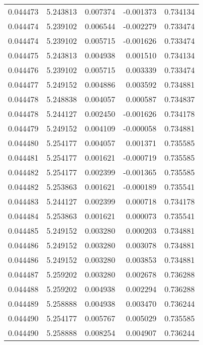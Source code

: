 \begin{tabular}{lrrrr}
0.044473    &  5.243813 &  0.007374 & -0.001373 &             0.734134 \\
0.044474    &  5.239102 &  0.006544 & -0.002279 &             0.733474 \\
0.044474    &  5.239102 &  0.005715 & -0.001626 &             0.733474 \\
0.044475    &  5.243813 &  0.004938 &  0.001510 &             0.734134 \\
0.044476    &  5.239102 &  0.005715 &  0.003339 &             0.733474 \\
0.044477    &  5.249152 &  0.004886 &  0.003592 &             0.734881 \\
0.044478    &  5.248838 &  0.004057 &  0.000587 &             0.734837 \\
0.044478    &  5.244127 &  0.002450 & -0.001626 &             0.734178 \\
0.044479    &  5.249152 &  0.004109 & -0.000058 &             0.734881 \\
0.044480    &  5.254177 &  0.004057 &  0.001371 &             0.735585 \\
0.044481    &  5.254177 &  0.001621 & -0.000719 &             0.735585 \\
0.044482    &  5.254177 &  0.002399 & -0.001365 &             0.735585 \\
0.044482    &  5.253863 &  0.001621 & -0.000189 &             0.735541 \\
0.044483    &  5.244127 &  0.002399 &  0.000718 &             0.734178 \\
0.044484    &  5.253863 &  0.001621 &  0.000073 &             0.735541 \\
0.044485    &  5.249152 &  0.003280 &  0.000203 &             0.734881 \\
0.044486    &  5.249152 &  0.003280 &  0.003078 &             0.734881 \\
0.044486    &  5.249152 &  0.003280 &  0.003853 &             0.734881 \\
0.044487    &  5.259202 &  0.003280 &  0.002678 &             0.736288 \\
0.044488    &  5.259202 &  0.004938 &  0.002294 &             0.736288 \\
0.044489    &  5.258888 &  0.004938 &  0.003470 &             0.736244 \\
0.044490    &  5.254177 &  0.005767 &  0.005029 &             0.735585 \\
0.044490    &  5.258888 &  0.008254 &  0.004907 &             0.736244 \\

\end{tabular}
